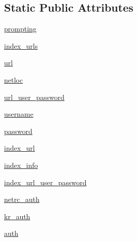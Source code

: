\subsection*{Static Public Attributes}
\begin{DoxyCompactItemize}
\item 
\hyperlink{classpip_1_1__internal_1_1network_1_1auth_1_1MultiDomainBasicAuth_a6a7037f9ddb77c8979bb92978fd2b448}{prompting}
\item 
\hyperlink{classpip_1_1__internal_1_1network_1_1auth_1_1MultiDomainBasicAuth_a9ba735c35c640118753c3e6f8f7afa08}{index\+\_\+urls}
\item 
\hyperlink{classpip_1_1__internal_1_1network_1_1auth_1_1MultiDomainBasicAuth_af866a5009b7b42347c818b9108d9f4c5}{url}
\item 
\hyperlink{classpip_1_1__internal_1_1network_1_1auth_1_1MultiDomainBasicAuth_a340a69df051e5db5e8d9d0b292c2a872}{netloc}
\item 
\hyperlink{classpip_1_1__internal_1_1network_1_1auth_1_1MultiDomainBasicAuth_a3820004b116fda3cbeb6d3cab8754cf9}{url\+\_\+user\+\_\+password}
\item 
\hyperlink{classpip_1_1__internal_1_1network_1_1auth_1_1MultiDomainBasicAuth_a8d63a8ef9a5fc8acf643990c42cd38dd}{username}
\item 
\hyperlink{classpip_1_1__internal_1_1network_1_1auth_1_1MultiDomainBasicAuth_a2a001a162247f8e73dbc8bde67ac6bd9}{password}
\item 
\hyperlink{classpip_1_1__internal_1_1network_1_1auth_1_1MultiDomainBasicAuth_ade05d32df5168d5d069e98f7efc052d7}{index\+\_\+url}
\item 
\hyperlink{classpip_1_1__internal_1_1network_1_1auth_1_1MultiDomainBasicAuth_af074db38270fde300ba03f5be0702b2f}{index\+\_\+info}
\item 
\hyperlink{classpip_1_1__internal_1_1network_1_1auth_1_1MultiDomainBasicAuth_a866393f21e1f245fbee3488c79946954}{index\+\_\+url\+\_\+user\+\_\+password}
\item 
\hyperlink{classpip_1_1__internal_1_1network_1_1auth_1_1MultiDomainBasicAuth_ad81901ccf8d41f5bd2d81a35b9cae3d6}{netrc\+\_\+auth}
\item 
\hyperlink{classpip_1_1__internal_1_1network_1_1auth_1_1MultiDomainBasicAuth_a34bb85b915e0065b75342e5c7995c16a}{kr\+\_\+auth}
\item 
\hyperlink{classpip_1_1__internal_1_1network_1_1auth_1_1MultiDomainBasicAuth_a9dde75fcb464dda622fd386a47dcacff}{auth}
\end{DoxyCompactItemize}


